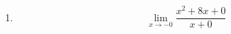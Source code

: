 \documentclass[12pt,notitlepage]{minimal}
\begin{document}
\begin{enumerate}
\item \[\lim_{x \to -0} \frac{x^2 + 8x + 0}{x + 0}\]

\end{enumerate}
\end{document}
